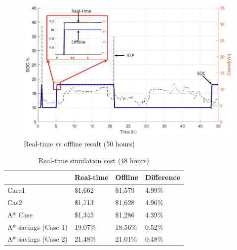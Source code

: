 \begin{figure}[!ht]
    \centering
    \includegraphics[width = \linewidth]{figs/RT_TESTING.png}
    \caption{Real-time vs offline result (50  hours)}
    \label{fig:RT_TESTING}
\end{figure}



\begin{table}[htb]
\centering
\caption{Real-time simulation cost (48 hours)}
\label{tab:rt_cost}
\begin{tabular}{l|l|l|l|}
\cline{2-4}
                                          & Real-time & Offline & Difference \\ \hline
\multicolumn{1}{|l|}{Case1}               & \$1,662   & \$1,579 & 4.99\%     \\ \hline
\multicolumn{1}{|l|}{Cas2}                & \$1,713   & \$1,628 & 4.96\%     \\ \hline
\multicolumn{1}{|l|}{A* Case}             & \$1,345   & \$1,286 & 4.39\%     \\ \hline
\multicolumn{1}{|l|}{A* savings (Case 1)} & 19.07\%   & 18.56\% & 0.52\%     \\ \hline
\multicolumn{1}{|l|}{A* savings (Case 2)} & 21.48\%   & 21.01\% & 0.48\%     \\ \hline
\end{tabular}
\end{table}